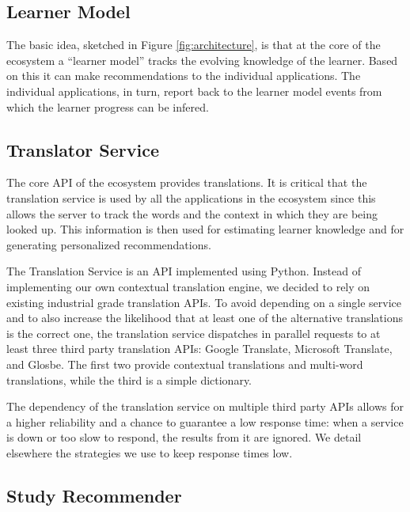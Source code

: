 \subsection{Learner Model}

The basic idea, sketched in Figure \ref{fig:architecture}, is that at the core of the ecosystem a ``learner model'' tracks the evolving knowledge of the learner. Based on this it can make recommendations to the individual applications. The individual applications, in turn, report back to the learner model events from which the learner progress can be infered. 


\subsection{Translator Service}

The core API of the ecosystem provides translations. It is critical that the translation service is used by all the applications in the ecosystem since this allows the server to track the words and the context in which they are being looked up. This information is then used for estimating learner knowledge and for generating personalized recommendations. 

The Translation Service is an API implemented using Python. Instead of implementing our own contextual translation engine, we decided to rely on existing industrial grade translation APIs. To avoid depending on a single service and to also increase the likelihood that at least one of the alternative translations is the correct one, the translation service dispatches in parallel requests to at least three third party translation APIs: Google Translate, Microsoft Translate, and Glosbe. \cite{Jager17-mux} The first two provide contextual translations and multi-word translations, while the third is a simple dictionary. 

The dependency of the translation service on multiple third party APIs allows for a higher reliability and a chance to guarantee a low response time: when a service is down or too slow to respond, the results from it are ignored. We detail elsewhere the strategies we use to keep response times low\cite{Jager17-mux}.


\subsection{Study Recommender}

